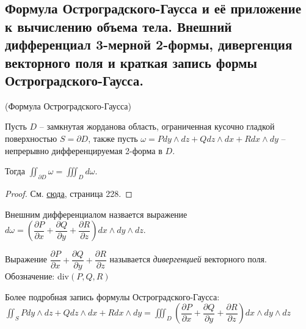 \subsection{Формула Остроградского-Гаусса и её приложение к вычислению объема тела. Внешний дифференциал 3-мерной 2-формы, дивергенция векторного поля и краткая запись формы Остроградского-Гаусса.}

\begin{theorem*}
    (Формула Остроградского-Гаусса)

    Пусть $D$ -- замкнутая жорданова область, ограниченная кусочно гладкой поверхностью $S = \partial D$, также
    пусть $\omega = P dy \wedge dz + Q dz \wedge dx + R dx \wedge dy$ -- непрерывно дифференцируемая 2-форма в $D$.

    Тогда $\iint_{\partial D} \omega = \iiint_{D} d\omega$.

\end{theorem*}

\begin{proof}
    См. \href{https://drive.google.com/file/d/1FxWvJSWedEf2lZ2jY8S7vkcWpLBmSr9d/view}{сюда}, страница 228.
\end{proof}

\begin{definition*}
    Внешним дифференциалом назвается выражение $d\omega = \left(\dfrac{\partial P}{\partial x} + \dfrac{\partial Q}{\partial y} + \dfrac{\partial R}{\partial z}\right) dx \wedge dy \wedge dz$.
\end{definition*}

\begin{definition*}
    Выражение $\dfrac{\partial P}{\partial x} + \dfrac{\partial Q}{\partial y} + \dfrac{\partial R}{\partial z}$ называется \textit{дивергенцией} векторного поля. Обозначение: div$(P, Q, R)$
\end{definition*}

Более подробная запись формулы Остроградского-Гаусса: $\iint_{S} P dy \wedge dz + Q dz \wedge dx + R dx \wedge dy = \iiint_{D}\left(\dfrac{\partial P}{\partial x} + \dfrac{\partial Q}{\partial y} + \dfrac{\partial R}{\partial z}\right) dx \wedge dy \wedge dz$